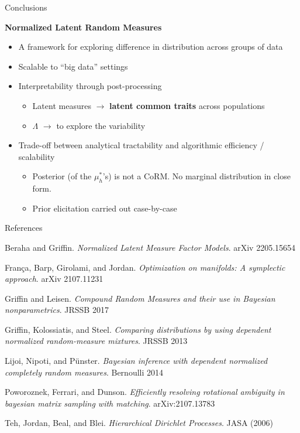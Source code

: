 \documentclass[10.5pt, aspectratio=169]{beamer} %
\begin{document}
\begin{frame}{Conclusions}

\textbf{Normalized Latent Random Measures}

\medskip

\begin{itemize}[<+->]
	\setlength{\itemsep}{1.2em}
	
	\item A framework for exploring difference in distribution across groups of data
	
	\item Scalable to ``big data'' settings
	
	\item Interpretability through post-processing
	\begin{itemize}
		\item Latent measures $\longrightarrow$ \textbf{latent common traits} across populations
		\item $\Lambda$ $\longrightarrow$  to explore the variability
	\end{itemize}
	
	\item Trade-off between analytical tractability and algorithmic efficiency / scalability
	\begin{itemize}
		\item Posterior (of the $\mu^*_h$'s) is not a CoRM. No marginal distribution in close form.
		\item Prior elicitation carried out case-by-case
	\end{itemize}
	
\end{itemize}

\end{frame}


\begin{frame}{References}

\alert{
Beraha and Griffin. \emph{Normalized Latent Measure Factor Models}. arXiv 2205.15654}

\medskip
França, Barp, Girolami, and Jordan. \emph{Optimization on manifolds: A symplectic approach}.  arXiv 2107.11231

\medskip
Griffin and Leisen. \emph{Compound Random Measures and their use in Bayesian nonparametrics}. JRSSB 2017

\medskip
Griffin, Kolossiatis, and Steel. \emph{Comparing distributions by using dependent normalized random-measure mixtures}. JRSSB 2013

\medskip
Lijoi, Nipoti, and P{\"u}nster. \emph{Bayesian inference with dependent normalized completely random measures}. Bernoulli 2014

\medskip
Poworoznek, Ferrari, and Dunson. \emph{Efficiently resolving rotational ambiguity in bayesian matrix sampling with matching}. arXiv:2107.13783

\medskip
Teh, Jordan, Beal, and Blei. \emph{Hierarchical Dirichlet Processes}. JASA (2006)

\end{frame}
\end{document}
